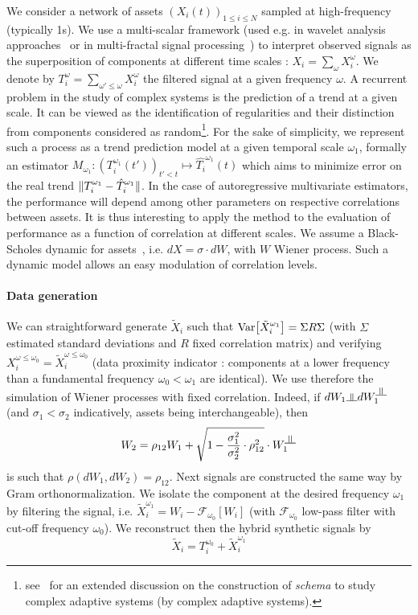 We consider a network of assets $(X_i(t))_{1\leq i \leq N}$ sampled at high-frequency (typically 1s). We use a multi-scalar framework (used e.g. in wavelet analysis approaches~\cite{ramsey2002wavelets} or in multi-fractal signal processing~\cite{bouchaud2000apparent}) to interpret observed signals as the superposition of components at different time scales : $X_i=\sum_{\omega}{X_i^{\omega}}$. We denote by $T_i^{\omega} = \sum_{\omega' \leq \omega} X_i^{\omega}$ the filtered signal at a given frequency $\omega$. A recurrent problem in the study of complex systems is the prediction of a trend at a given scale. It can be viewed as the identification of regularities and their distinction from components considered as random\footnote{see~\cite{gell1995quark} for an extended discussion on the construction of \emph{schema} to study complex adaptive systems (by complex adaptive systems).}. For the sake of simplicity, we represent such a process as a trend prediction model at a given temporal scale $\omega_1$, formally an estimator $M_{\omega_1} : (T_i^{\omega_1}(t'))_{t'<t} \mapsto \hat{T_i}^{\omega_1}(t)$ which aims to minimize error on the real trend $\| T_i^{\omega_1} - \hat{T}_i^{\omega_1} \|$. In the case of autoregressive multivariate estimators, the performance will depend among other parameters on respective correlations between assets. It is thus interesting to apply the method to the evaluation of performance as a function of correlation at different scales. We assume a Black-Scholes dynamic for assets~\cite{jarrow1999honor}, i.e. $dX = \sigma\cdot dW$, with $W$ Wiener process. Such a dynamic model allows an easy modulation of correlation levels.


\paragraph{Data generation}

We can straightforward generate $\tilde{X}_i$ such that $\operatorname{Var}\!\left[\tilde{X}_i^{\omega_1}\right]=\Sigma R \Sigma$ (with $\Sigma$ estimated standard deviations and $R$ fixed correlation matrix) and verifying $X_i^{\omega \leq \omega_0} = \tilde{X}_i^{\omega \leq \omega_0}$ (data proximity indicator : components at a lower frequency than a fundamental frequency $\omega_0 < \omega_1$ are identical). We use therefore the simulation of Wiener processes with fixed correlation. Indeed, if $dW_1 \indep dW_1^{\indep}$ (and $\sigma_1 < \sigma_2$ indicatively, assets being interchangeable), then
\[
W_2 = \rho_{12}W_1 + \sqrt{1-\frac{\sigma_1^2}{\sigma_2^2}\cdot\rho_{12}^2}\cdot W_1^{\indep}
\]
is such that $\rho(dW_1,dW_2)=\rho_{12}$. Next signals are constructed the same way by Gram orthonormalization. We isolate the component at the desired frequency $\omega_1$ by filtering the signal, i.e. $\tilde{X}_i^{\omega_1} = W_i - \mathcal{F}_{\omega_0}[W_i]$ (with $\mathcal{F}_{\omega_0}$ low-pass filter with cut-off frequency $\omega_0$). We reconstruct then the hybrid synthetic signals by 
\begin{equation}
\tilde{X}_i = T_i^{\omega_0} + \tilde{X}_i^{\omega_1}
\end{equation}


